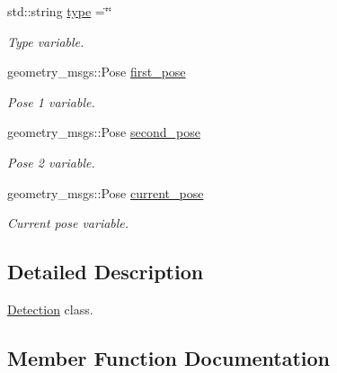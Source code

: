 \begin{DoxyCompactItemize}
\mbox{\label{classDetection_a4ab4e17edde2c524b27b6c0a7cd553a3}} 
std\+::string \hyperlink{classDetection_a4ab4e17edde2c524b27b6c0a7cd553a3}{type} =\char`\"{}\char`\"{}
\begin{DoxyCompactList}\small\item\em Type variable. \end{DoxyCompactList}\item 
\mbox{\label{classDetection_aa81dc0bbc383403eca0a313d7fb38d47}} 
geometry\+\_\+msgs\+::\+Pose \hyperlink{classDetection_aa81dc0bbc383403eca0a313d7fb38d47}{first\+\_\+pose}
\begin{DoxyCompactList}\small\item\em Pose 1 variable. \end{DoxyCompactList}\item 
\mbox{\label{classDetection_a0a0e90d58cd33f97d243fb439b201dcd}} 
geometry\+\_\+msgs\+::\+Pose \hyperlink{classDetection_a0a0e90d58cd33f97d243fb439b201dcd}{second\+\_\+pose}
\begin{DoxyCompactList}\small\item\em Pose 2 variable. \end{DoxyCompactList}\item 
\mbox{\label{classDetection_ab5c9ff6b31a682762262b930e5fb8de1}} 
geometry\+\_\+msgs\+::\+Pose \hyperlink{classDetection_ab5c9ff6b31a682762262b930e5fb8de1}{current\+\_\+pose}
\begin{DoxyCompactList}\small\item\em Current pose variable. \end{DoxyCompactList}\end{DoxyCompactItemize}


\subsection{Detailed Description}
\hyperlink{classDetection}{Detection} class. 

\subsection{Member Function Documentation}
\mbox{\label{classDetection_ab9da7e3347faeced1a83edbdbb9843ee}} 
